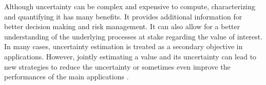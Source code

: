 Although uncertainty can be complex and expensive to compute, characterizing and quantifying it has many benefits. It provides  additional information for better decision making and risk management. It can also allow for a better understanding of the underlying processes at stake regarding the value of interest. In many cases, uncertainty estimation is treated as a secondary objective in applications. However, jointly estimating a value and its uncertainty can lead to new strategies to reduce the uncertainty or sometimes even improve the performances of the main applications \cite{chen_learning_2023,jiang_unsupervised_2024}.

